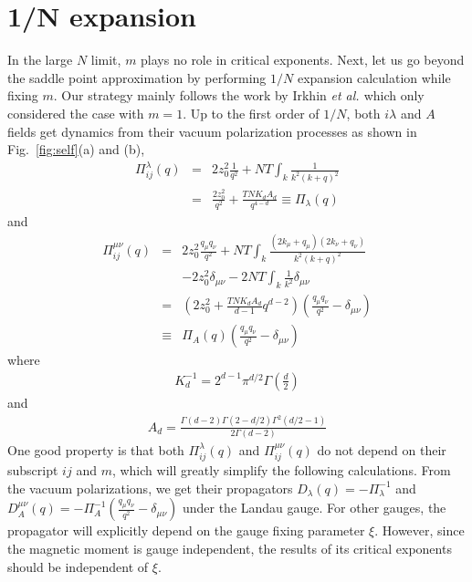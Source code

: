 \documentclass[aps,twocolumn,superscriptaddress]{revtex4-1}
\newcommand{\bea}{\begin{eqnarray}}
\newcommand{\eea}{\end{eqnarray}}
\newcommand{\etal}{\textit{et al.{ }}}
\begin{document}
\section{1/N expansion}
In the large $N$ limit, $m$ plays no role in critical exponents. 
Next, let us go
beyond the saddle point approximation by performing $1/N$ expansion calculation while fixing $m$. Our strategy mainly follows the work by
Irkhin \etal \cite{irkhin1996} which only considered the case with $m=1$. Up to the first order of $1/N$, both
$i\lambda$ and $A$ fields get dynamics from their vacuum polarization processes as shown in Fig.~\ref{fig:self}(a) and (b),
\bea \Pi_{ij}^\lambda(q)&=&2z_0^2\frac{1}{q^2} + NT\int_k \frac{1}{k^2(k+q)^2} \nonumber\\
                        &=&\frac{2z_0^2}{q^2}+\frac{TNK_dA_d}{q^{4-d}} \equiv \Pi_\lambda(q) \eea and \bea
\Pi_{ij}^{\mu\nu}(q) &=& 2z_0^2 \frac{q_\mu q_\nu}{q^2} + NT\int_k \frac{(2k_\mu+q_\mu)(2k_\nu+q_\nu)}{k^2(k+q)^2}
\nonumber\\ && - 2z_0^2 \delta_{\mu\nu} -2NT\int_k \frac{1}{k^2}\delta_{\mu\nu}  \nonumber\\
            &=&\left(2z_0^2+\frac{TNK_dA_d}{d-1} q^{d-2}\right)\left(\frac{q_\mu q_\nu}{q^2}-\delta_{\mu\nu}\right)
\nonumber\\ &\equiv& \Pi_A(q)\left(\frac{q_\mu q_\nu}{q^2}-\delta_{\mu\nu}\right) \eea where \bea
K_d^{-1}=2^{d-1}\pi^{d/2}\Gamma\left(\frac{d}{2}\right) \eea and \bea
A_d=\frac{\Gamma(d-2)\Gamma(2-d/2)\Gamma^2(d/2-1)}{2\Gamma(d-2)} \eea 
One good property is that both
$\Pi_{ij}^\lambda(q)$ and $\Pi_{ij}^{\mu\nu}(q)$ do not depend on their subscript $ij$ and $m$, which will greatly
simplify the following calculations. From the vacuum polarizations, we get their propagators
$D_\lambda(q)=-\Pi_\lambda^{-1}$ and $D_A^{\mu\nu}(q)=-\Pi_A^{-1}\left(\frac{q_\mu q_\nu}{q^2}-\delta_{\mu\nu}\right)$
under the Landau gauge. For other gauges, the propagator will explicitly depend on the gauge fixing parameter $\xi$. 
However, since the magnetic moment is gauge independent, the results of its critical exponents should be independent of $\xi$. \cite{kaul2008}
\end{document}
